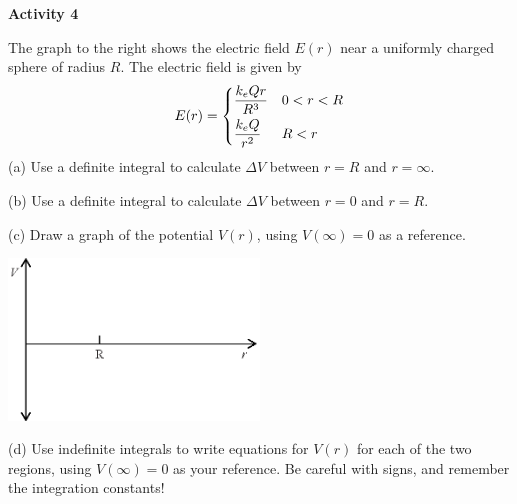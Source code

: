\textbf{Activity 4} 

The graph to the right shows the electric field $E(r)$ near a uniformly charged sphere of radius $R$.  The electric field is given by
\begin{displaymath}
E(r) = \begin{dcases}
        \frac{k_eQr}{R^3}  &  0<r<R\\
        \frac{k_eQ}{r^2}  &  R<r
        \end{dcases}
\end{displaymath}
(a) Use a definite integral to calculate $\Delta V$  between $r=R$ and $r=\infty$.
\vspace{1.1in}

(b) Use a definite integral to calculate $\Delta V$ between $r=0$ and $r=R$.
\vspace{1.1in}

(c) Draw a graph of the potential $V(r)$, using $V(\infty)=0$ as a reference.
\begin{center}
\includegraphics[width=0.5\textwidth]{finding_v_from_e/fig8.eps}
\end{center}

(d) Use indefinite integrals to write equations for $V(r)$ for each of the two regions, using $V(\infty)=0$ as your reference.  Be careful with signs, and remember the integration constants!
\vspace{1.3in}
